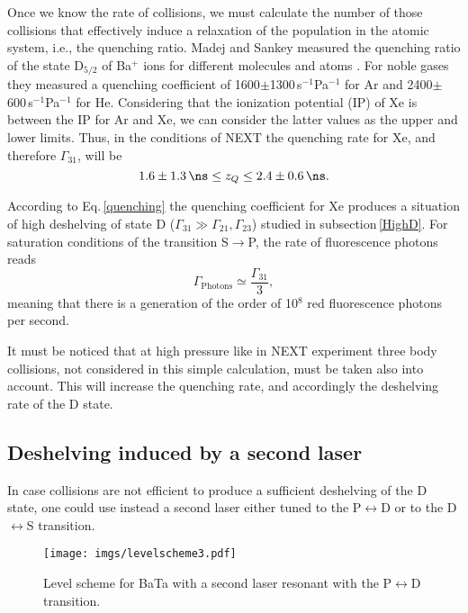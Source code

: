 Once we know the rate of collisions, we must calculate the number of those collisions that effectively induce a relaxation of the population in the atomic system, i.e., the quenching ratio. Madej and Sankey measured the quenching ratio of the state D$_{5/2}$ of Ba$^+$ ions for different molecules and atoms \cite{Sankey90}. For noble gases they measured a quenching coefficient of 1600$\pm$1300\,s$^{-1}$Pa$^{-1}$ for Ar and 2400$\pm$600\,s$^{-1}$Pa$^{-1}$ for He. Considering that the ionization potential (IP) of Xe is  between the IP for Ar and Xe, we can consider the latter values as the upper and lower limits. Thus, in the conditions of NEXT the quenching rate for Xe, and therefore $\Gamma_{31}$, will be
\begin{equation}
\label{quenching}
1.6\pm1.3\,\text{\ns} \leq z_Q \leq 2.4\pm0.6\,\text{\ns}. 
\end{equation}

According to Eq.\,\ref{quenching} the quenching coefficient for Xe produces a situation of high deshelving of state D ($\Gamma_{31}\gg\Gamma_{21}, \Gamma_{23}$) studied in subsection\,\ref{HighD}. For saturation conditions of the transition S$\rightarrow$P, the rate of fluorescence photons reads
\begin{equation}
\Gamma_{\text{Photons}}\simeq\frac{\Gamma_{31}}{3},
\end{equation}
meaning that there is a generation of the order of 10$^8$ red fluorescence photons per second.

It must be noticed that at high pressure like in NEXT experiment three body collisions, not considered in this simple calculation, must be taken also into account. This will increase the quenching rate, and accordingly the deshelving rate of the D state. 

\subsection{Deshelving induced by a second laser}

In case collisions are not efficient to produce a sufficient deshelving of the D state, one could use instead a second laser either tuned to the P$\leftrightarrow$D or to the D$\leftrightarrow$S transition. 

\begin{figure}[ht!]
\texttt{[image: imgs/levelscheme3.pdf]}
\caption{\label{levelscheme3} Level scheme for BaTa with a second laser resonant with the P$\leftrightarrow$D transition.}
\end{figure}

